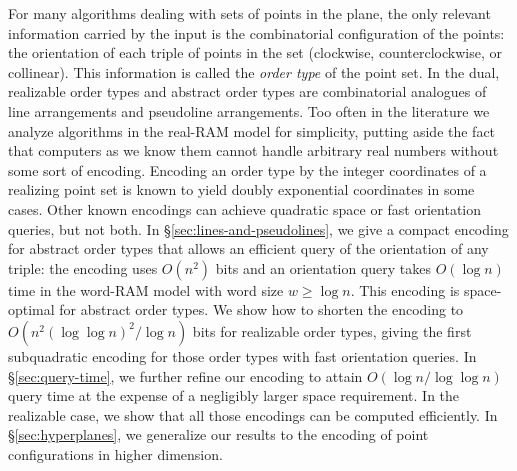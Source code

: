 	For many algorithms dealing with sets of points in the plane, the only
	relevant information carried by the input is the combinatorial
	configuration of the points: the orientation of each triple of points in
	the set (clockwise, counterclockwise, or collinear). This information is
	called the \emph{order type} of the point set.
%
	In the dual, realizable order types and abstract order types are
	combinatorial analogues of line arrangements and pseudoline arrangements.
%
	Too often in the literature we analyze algorithms in the
	real-RAM model for simplicity, putting aside the fact that computers as we
	know them cannot handle arbitrary real numbers without some sort of
	encoding.
%
	Encoding an order type by the integer coordinates of a realizing point
	set is known to yield doubly exponential coordinates in some cases. Other
	known encodings can achieve quadratic space or fast orientation queries,
	but not both.
%
	In \S\ref{sec:lines-and-pseudolines},
	we give a compact encoding for abstract order types
	that allows an efficient query of the orientation of any triple: the encoding
	uses \( O(n^2) \) bits and an orientation query takes \(O(\log n)\) time in
	the word-RAM model with word size \(w \geq \log n\).
%
	This encoding is space-optimal for abstract order types. We show how to
	shorten the encoding to \(O(n^2 {(\log\log n)}^2 / \log n)\) bits for
	realizable order types, giving the first subquadratic encoding for those
	order types with fast orientation queries.
%
	In \S\ref{sec:query-time}, we further refine our encoding to attain
	\(O(\log n/\log\log n)\) query time at the expense of a negligibly larger
	space requirement.
%
	In the realizable case, we show that all those encodings can be computed
	efficiently.
%
	In \S\ref{sec:hyperplanes},
	we generalize our results to the encoding of point configurations
	in higher dimension.
